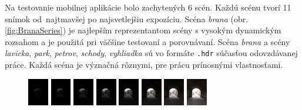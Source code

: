 Na testovanie mobilnej aplikácie bolo zachytených 6 scén. Každú scénu tvorí 11 snímok od~najtmavšej po najsvetlejšiu
expozíciu. Scéna \textit{brana} (obr. \ref{fig:BranaSeries}) je najlepším reprezentantom scény s vysokým dynamickým
rozsahom a je použitá pri väčšine testovaní a porovnávaní. Scéna \textit{brana} a scény \textit{lavicka}, \textit{park},
\textit{petrov}, \textit{schody}, \textit{vyhliadka} sú vo formáte \texttt{.hdr} súčasťou odovzdávanej práce. Každá scéna
je význačná rôznymi, pre prácu prínosnými vlastnosťami.

\begin{figure}[t]
  \centering
  \includegraphics[width=0.08\textwidth]{figures/capturing/series/s0}
	\includegraphics[width=0.08\textwidth]{figures/capturing/series/s1}
	\includegraphics[width=0.08\textwidth]{figures/capturing/series/s2}
	\includegraphics[width=0.08\textwidth]{figures/capturing/series/s3}
	\includegraphics[width=0.08\textwidth]{figures/capturing/series/s4}
	\includegraphics[width=0.08\textwidth]{figures/capturing/series/s5}
	\includegraphics[width=0.08\textwidth]{figures/capturing/series/s6}
	\includegraphics[width=0.08\textwidth]{figures/capturing/series/s7}

\end{figure}
